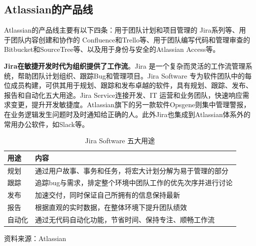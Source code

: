 \subsection{Atlassian的产品线}
Atlassian的产品线主要有以下四条：用于团队计划和项目管理的 Jira系列等、用于团队内容创建和协作的 Confluence和Trello等、用于团队编写代码和管理审查的 Bitbucket和SourceTree等、以及用于身份与安全的Atlassian Access等。

\textbf{Jira在敏捷开发时代为组织提供了工作流}。Jira 是一个复杂而灵活的工作流管理系统，帮助团队计划组织、跟踪Bug和管理项目。Jira Software 专为软件团队中的每位成员构建，可供其用于规划、跟踪和发布卓越的软件，具有规划、跟踪、发布、报告和自动化五大用途。Jira Service连接开发、IT 运营和业务团队，快速响应需求变更，提升开发敏捷度。Atlassian旗下的另一款软件Opsgene则集中管理警报，在业务逻辑发生问题时及时通知给正确的人。此外Jira也集成到Atlassian体系外的常用办公软件，如Slack等。
\begin{table}[H]
    \caption{Jira Software 五大用途}
    \begin{tabular}{ll}
        \toprule
        用途  & 内容                             \\
        \midrule
        规划  & 通过用户故事、事务和任务，将宏大计划分解为易于管理的部分   \\
        跟踪  & 追踪bug与需求，排定整个环境中团队工作的优先次序并进行讨论 \\
        发布  & 加速交付，同时保证自己所拥有的信息保持最新          \\
        报告  & 根据直观的实时数据，在整体环境下提升团队绩效         \\
        自动化 & 通过无代码自动化功能，节省时间、保持专注、顺畅工作流     \\
        \bottomrule
    \end{tabular}
    \footnotesize{资料来源：Atlassian}
\end{table}

